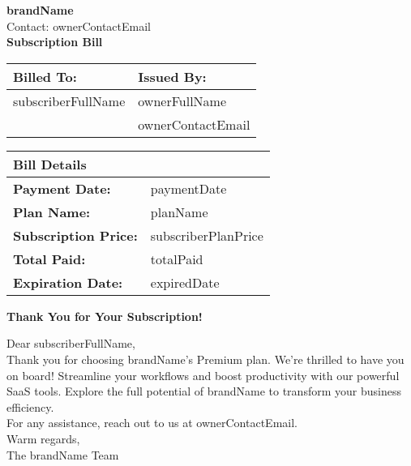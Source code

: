 \documentclass[a4paper,12pt]{article}
\begin{document}
    \begin{center}
        \textbf{\LARGE {{{brandName}}}} \\[0.2cm] %
        \small{Contact: {{{ownerContactEmail}}}} \\[0.5cm] %
        \textbf{\large Subscription Bill} \\[0.3cm]
    \end{center}

    \begin{tabular}{l l}
        \toprule
        \textbf{Billed To:} & \textbf{Issued By:} \\
        \midrule
        {{subscriberFullName}} & {{ownerFullName}} \\
        & {{ownerContactEmail}} \\
        \bottomrule
    \end{tabular}

    \vspace{0.5cm}

    \begin{tabular}{l l}
        \toprule
        \textbf{Bill Details} & \\
        \midrule
        \textbf{Payment Date:} & {{paymentDate}} \\
        \textbf{Plan Name:} & {{{planName}}} \\
        \textbf{Subscription Price:} & {{subscriberPlanPrice}} \\
        \textbf{Total Paid:} & {{totalPaid}} \\
        \textbf{Expiration Date:} & {{expiredDate}} \\
        \bottomrule
    \end{tabular}

    \vspace{0.5cm}

    \begin{center}
        \textbf{\color{headerblue}Thank You for Your Subscription!} \\[0.2cm]
    \end{center}
    Dear {{subscriberFullName}}, \\

    Thank you for choosing {{brandName}}'s Premium plan. We're thrilled to have you on board! Streamline your workflows and boost productivity with our powerful SaaS tools. Explore the full potential of {{brandName}} to transform your business efficiency. \\

    For any assistance, reach out to us at {{ownerContactEmail}}. \\

    Warm regards, \\
    The {{brandName}} Team
\end{document}
